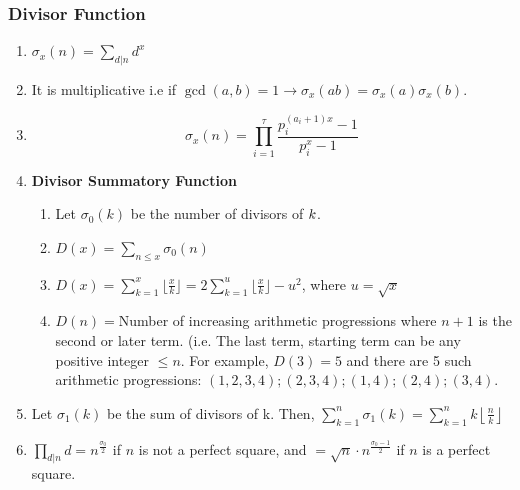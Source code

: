 \subsubsection{Divisor Function}\begin{enumerate}

            
            \item $\displaystyle \sigma_x(n)=\sum\limits_{d\vert n}^{}d^x$
            \item It is multiplicative i.e if $\displaystyle \gcd(a, b)=1\to \sigma_x(ab)=\sigma_x(a)\sigma_x(b)$.
            \item 
                \[\displaystyle \sigma_x(n)=\prod\limits_{i=1}^{\tau}\frac{p_i^{(a_i+1)x}-1}{p_i^x-1}\]
            
            \item \textbf{Divisor Summatory Function}
                \begin{enumerate}

                    \item Let $\displaystyle \sigma_0(k)$ be the number of divisors of $\displaystyle \displaystyle k$.
                    
                    \item $D(x)=\sum\limits_{n\leq{x}}{\sigma_0(n)}$
                    \item $D(x)=\sum\limits_{k=1}^{x}\lfloor\frac{x}{k}\rfloor=2\sum\limits_{k=1}^{u}\lfloor\frac{x}{k}\rfloor-u^2$,
                        where $u=\sqrt{x}$
                    \item $D(n)=$Number of increasing arithmetic progressions where $n+1$ is the second or later term.
                        (i.e.
                        The
                        last term, starting term can be any positive integer $\displaystyle \le n$. For example,
                        $D(3)=5$
                        and
                        there are 5 such arithmetic progressions: $\displaystyle (1, 2, 3, 4); (2, 3, 4); (1, 4); (2,
                        4);
                        (3,
                        4).$
                \end{enumerate}

            
            \item Let $\displaystyle \sigma_1(k)$ be the sum of divisors of k. Then, $\displaystyle
                \sum\limits_{k=1}^{n}\sigma_1(k)=\sum\limits_{k=1}^{n}{k \left\lfloor \frac{n}{k} \right\rfloor}$
            \item $\displaystyle \prod\limits_{d\vert n}^{}d={n^{\frac{\sigma_0}{2}}}$ if $n$ is not a perfect square, and
                $=\sqrt{n} \cdot n^{\frac{\sigma_0-1}{2}}$ if $n $ is a perfect square.
                \end{enumerate}
